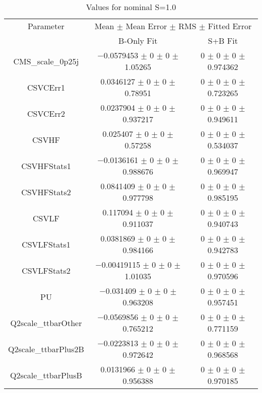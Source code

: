 \begin{table}
\centering
\caption{Values for nominal S=1.0}
\begin{tabular}{ccc}
\toprule
Parameter & \multicolumn{2}{c}{Mean $\pm$ Mean Error $\pm$ RMS $\pm$ Fitted Error}\\
 & B-Only Fit & S+B Fit\\
\midrule
CMS\_scale\_0p25j & \num{-0.0579453} $\pm$ \num{0} $\pm$ \num{0} $\pm$ \num{1.05265} & \num{0} $\pm$ \num{0} $\pm$ \num{0} $\pm$ \num{0.974362}\\
CSVCErr1 & \num{0.0346127} $\pm$ \num{0} $\pm$ \num{0} $\pm$ \num{0.78951} & \num{0} $\pm$ \num{0} $\pm$ \num{0} $\pm$ \num{0.723265}\\
CSVCErr2 & \num{0.0237904} $\pm$ \num{0} $\pm$ \num{0} $\pm$ \num{0.937217} & \num{0} $\pm$ \num{0} $\pm$ \num{0} $\pm$ \num{0.949611}\\
CSVHF & \num{0.025407} $\pm$ \num{0} $\pm$ \num{0} $\pm$ \num{0.57258} & \num{0} $\pm$ \num{0} $\pm$ \num{0} $\pm$ \num{0.534037}\\
CSVHFStats1 & \num{-0.0136161} $\pm$ \num{0} $\pm$ \num{0} $\pm$ \num{0.988676} & \num{0} $\pm$ \num{0} $\pm$ \num{0} $\pm$ \num{0.969947}\\
CSVHFStats2 & \num{0.0841409} $\pm$ \num{0} $\pm$ \num{0} $\pm$ \num{0.977798} & \num{0} $\pm$ \num{0} $\pm$ \num{0} $\pm$ \num{0.985195}\\
CSVLF & \num{0.117094} $\pm$ \num{0} $\pm$ \num{0} $\pm$ \num{0.911037} & \num{0} $\pm$ \num{0} $\pm$ \num{0} $\pm$ \num{0.940743}\\
CSVLFStats1 & \num{0.0381869} $\pm$ \num{0} $\pm$ \num{0} $\pm$ \num{0.984166} & \num{0} $\pm$ \num{0} $\pm$ \num{0} $\pm$ \num{0.942783}\\
CSVLFStats2 & \num{-0.00419115} $\pm$ \num{0} $\pm$ \num{0} $\pm$ \num{1.01035} & \num{0} $\pm$ \num{0} $\pm$ \num{0} $\pm$ \num{0.970596}\\
PU & \num{-0.031409} $\pm$ \num{0} $\pm$ \num{0} $\pm$ \num{0.963208} & \num{0} $\pm$ \num{0} $\pm$ \num{0} $\pm$ \num{0.957451}\\
Q2scale\_ttbarOther & \num{-0.0569856} $\pm$ \num{0} $\pm$ \num{0} $\pm$ \num{0.765212} & \num{0} $\pm$ \num{0} $\pm$ \num{0} $\pm$ \num{0.771159}\\
Q2scale\_ttbarPlus2B & \num{-0.0223813} $\pm$ \num{0} $\pm$ \num{0} $\pm$ \num{0.972642} & \num{0} $\pm$ \num{0} $\pm$ \num{0} $\pm$ \num{0.968568}\\
Q2scale\_ttbarPlusB & \num{0.0131966} $\pm$ \num{0} $\pm$ \num{0} $\pm$ \num{0.956388} & \num{0} $\pm$ \num{0} $\pm$ \num{0} $\pm$ \num{0.970185}\\

\end{tabular}
\end{table}
